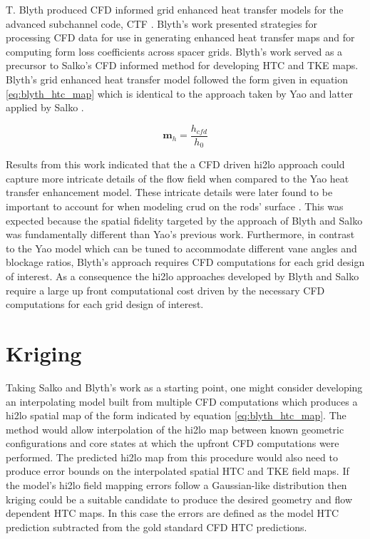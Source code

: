 T. Blyth produced CFD informed grid enhanced heat transfer models for the advanced subchannel code, CTF \cite{blyth2014} \cite{blyth2017}.  Blyth's work presented strategies for processing CFD data for use in generating enhanced heat transfer maps and for computing form loss coefficients across spacer grids.  Blyth's work served as a precursor to Salko's CFD informed method for developing HTC and TKE maps.  Blyth's grid enhanced heat transfer model followed the form given in equation \ref{eq:blyth_htc_map} which is identical to the approach taken by Yao and latter applied by Salko \cite{yao82} \cite{salko17}.

\begin{equation}
\mathbf m_h = \frac{h_{cfd}}{h_0}
\label{eq:blyth_htc_map}
\end{equation}

Results from this work indicated that the a CFD driven hi2lo approach could capture more intricate details of the flow field when compared to the Yao heat transfer enhancement model.  These intricate details were later found to be important to account for when modeling crud on the rods' surface \cite{slattery16}.   This was expected because the spatial fidelity targeted by the approach of Blyth and Salko was fundamentally different than Yao's previous work.  Furthermore, in contrast to the Yao model which can be tuned to accommodate different vane angles and blockage ratios,  Blyth's approach requires CFD computations for each grid design of interest. 
As a consequence the hi2lo approaches developed by Blyth and Salko require a large up front computational cost driven by the necessary CFD computations for each grid design of interest.

\section{Kriging}

Taking Salko and Blyth's work as a starting point, one might consider developing an interpolating model built from multiple CFD computations which produces a hi2lo spatial map of the form indicated by equation \ref{eq:blyth_htc_map}.  The method would allow interpolation of the hi2lo map between known geometric configurations and core states at which the upfront CFD computations were performed.  The predicted hi2lo map from this procedure would also need to produce error bounds on the interpolated spatial HTC and TKE field maps.  If the model's hi2lo field mapping errors follow a Gaussian-like distribution then kriging could be a suitable candidate to produce the desired geometry and flow dependent HTC maps.  In this case the errors are defined as the model HTC prediction subtracted from the gold standard CFD HTC predictions.

